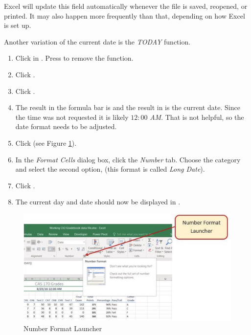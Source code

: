 Excel will update this field automatically whenever the file is saved, reopened, or printed. It may also happen more frequently than that, depending on how Excel is set up.

Another variation of the current date is the \textit{TODAY} function.

\begin{enumerate}
	\item Click in . Press  to remove the  function.
	\item Click . 
	\item Click .
	\item The result in the formula bar is  and the result in  is the current date. Since the time was not requested it is likely $ 12\!:\!00 $\textit{ AM}. That is not helpful, so the date format needs to be adjusted.
	\item Click  (see Figure \ref{03:fig17}).
	\item In the \textit{Format Cells} dialog box, click the \textit{Number} tab. Choose the  category and select the second option,  (this format is called \textit{Long Date}).
	\item Click .
	\item The current day and date should now be displayed in .
\end{enumerate}

\begin{figure}[H]
	\centering
	\includegraphics[width=\maxwidth{.95\linewidth}]{gfx/ch03_fig17}
	\caption{Number Format Launcher}
	\label{03:fig17}
\end{figure}

